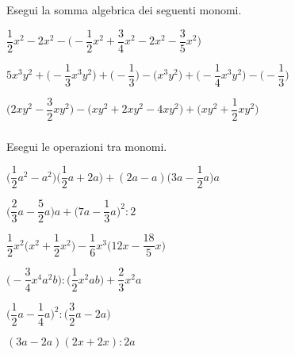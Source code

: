 \begin{esercizio}
 \label{ese:9.32}
Esegui la somma algebrica dei seguenti monomi.

\begin{enumeratea}
\spazielenx
 \item 
$\dfrac{1}{2}x^{2}-2x^{2}-\bigg(-{\dfrac{1}{2}}x^{2}+\dfrac{3}{4}x^{2}-2x^{2}
-\dfrac{3}{5}x^{2}\bigg)$
 \item 
$5x^{3}y^{2}+\bigg(-{\dfrac{1}{3}}x^{3}y^{2}\bigg)+\bigg(-{\dfrac{1}{3}}
\bigg)-\big(x^{3}y^{2}\big)+\bigg(-{\dfrac{1}{4}}x^{3}y^{2}\bigg)-\bigg(-{\dfrac
{1}{3}}\bigg)$
 \item 
$\bigg(2xy^{2}-\dfrac{3}{2}xy^{2}\bigg)-\big(xy^{2}+2xy^{2}-4xy^{2}
\big)+\bigg(xy^{2}+\dfrac{1}{2}xy^{2}\bigg)$
\end{enumeratea}
\end{esercizio}

\subsubsection*{}

\begin{esercizio}[\Ast]
 \label{ese:9.33}
Esegui le operazioni tra monomi.

\begin{enumeratea}
 \item 
$\bigg(\dfrac{1}{2}a^{2}-a^{2}\bigg)\bigg(\dfrac{1}{2}
a+2a\bigg)+(2a-a)\bigg(3a-\dfrac{1}{2}a\bigg)a$
 \item 
$\bigg(\dfrac{2}{3}a-\dfrac{5}{2}a\bigg)a+\bigg(7a-\dfrac{1}{3}a\bigg)^{2}:2$
 \item 
$\dfrac{1}{2}x^{2}\bigg(x^{2}+\dfrac{1}{2}x^{2}\bigg)-\dfrac{1}{6}x^{3}
\bigg(12x-\dfrac{18}{5}x\bigg)$
 \item 
$\bigg(-{\dfrac{3}{4}}x^{4}a^{2}b\bigg):\bigg(\dfrac{1}{2}x^{2}ab\bigg)+\dfrac{2
}{3}x^{2}a$
 \item 
$\bigg(\dfrac{1}{2}a-\dfrac{1}{4}a\bigg)^{2}:\bigg(\dfrac{3}{2}a-2a\bigg)$
 \item $(3a-2a)(2x+2x):2a$
\end{enumeratea}
\end{esercizio}

